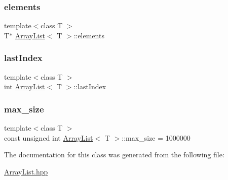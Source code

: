 \mbox{\label{class_array_list_a41c2a7b127fca888e75a6fca13cc043d}} 
\subsubsection{\texorpdfstring{elements}{elements}}
{\footnotesize\ttfamily template$<$class T $>$ \\
T$\ast$ \hyperlink{class_array_list}{Array\+List}$<$ T $>$\+::elements\hspace{0.3cm}{\ttfamily [private]}}

\mbox{\label{class_array_list_aad2f93761ddbe2404729a68178c228b7}} 
\subsubsection{\texorpdfstring{last\+Index}{lastIndex}}
{\footnotesize\ttfamily template$<$class T $>$ \\
int \hyperlink{class_array_list}{Array\+List}$<$ T $>$\+::last\+Index\hspace{0.3cm}{\ttfamily [private]}}

\mbox{\label{class_array_list_ab4aa4eb35267e0f92e6ac4f748c9974e}} 
\subsubsection{\texorpdfstring{max\+\_\+size}{max\_size}}
{\footnotesize\ttfamily template$<$class T $>$ \\
const unsigned int \hyperlink{class_array_list}{Array\+List}$<$ T $>$\+::max\+\_\+size = 1000000\hspace{0.3cm}{\ttfamily [private]}}



The documentation for this class was generated from the following file\+:\begin{DoxyCompactItemize}
\item 
\hyperlink{_array_list_8hpp}{Array\+List.\+hpp}\end{DoxyCompactItemize}

